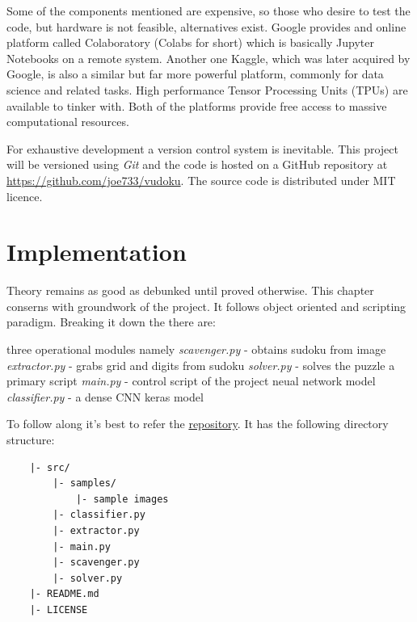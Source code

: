 \documentclass[12pt, a4paper]{report}
\begin{document}
Some of the components mentioned are expensive, so those who desire to test the code, but hardware is not feasible, alternatives exist. Google provides and online platform called Colaboratory (Colabs for short) which is basically Jupyter Notebooks on a remote system. Another one Kaggle, which was later acquired by Google, is also a similar but far more powerful platform, commonly for data science and related tasks. High performance Tensor Processing Units (TPUs) are available to tinker with. Both of the platforms provide free access to massive computational resources.

For exhaustive development a version control system is inevitable. This project will be versioned using \emph{Git} and the code is hosted on a GitHub repository at \url{https://github.com/joe733/vudoku}. The source code is distributed under MIT licence.
\vspace*{\fill}

\chapter{Implementation}
\label{chap:implementation}
\thispagestyle{fancy}
\hspace{0.5cm} Theory remains as good as debunked until proved otherwise. This chapter conserns with groundwork of the project. It follows object oriented and scripting paradigm. Breaking it down the there are:

\begin{outline}
    \1 three operational modules namely
        \2 \textit{scavenger.py} - obtains sudoku from image
        \2 \textit{extractor.py} - grabs grid and digits from sudoku
        \2 \textit{solver.py} - solves the puzzle
    \1 a primary script
        \2 \textit{main.py} - control script of the project
    \1  neual network model
        \2 \textit{classifier.py} - a dense CNN keras model
\end{outline}

To follow along it's best to refer the \href{https://github.com/joe733/vudoku}{repository}. It has the following directory structure:

\begin{lstlisting}
    |- src/
        |- samples/
            |- sample images
        |- classifier.py
        |- extractor.py
        |- main.py
        |- scavenger.py
        |- solver.py
    |- README.md
    |- LICENSE
\end{lstlisting}
\end{document}
